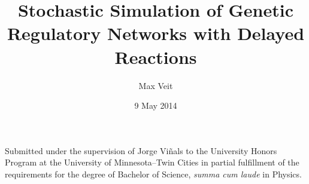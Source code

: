 \documentclass[english,letterpaper,12pt]{report}
\begin{document}
\title{Stochastic Simulation of Genetic Regulatory Networks with Delayed Reactions}
\author{Max Veit}
\date{9 May 2014}


\begin{titlepage}
    \makeatletter
    \begin{center}
        \vspace{1in}

        \LARGE \@title

        \vspace{0.5in}

        \large \@author

        \vspace{1in}

    \end{center}
    \normalsize
        Submitted under the supervision of Jorge Viñals to the University Honors Program at the University of Minnesota--Twin Cities in partial fulfillment of the requirements for the degree of Bachelor of Science, \textit{summa cum laude} in Physics.
    \begin{center}

        \vspace{0.5in}

        \large \@date
    \end{center}
    \makeatother
\end{titlepage}
 
\end{document}
